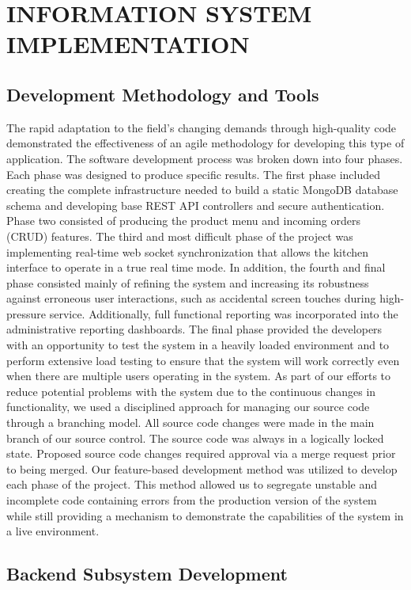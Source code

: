 \chapter{INFORMATION SYSTEM IMPLEMENTATION}

\section{Development Methodology and Tools}

The rapid adaptation to the field's changing demands through high-quality code demonstrated the effectiveness of an agile methodology for developing this type of application. The software development process was broken down into four phases. Each phase was designed to produce specific results. The first phase included creating the complete infrastructure needed to build a static MongoDB database schema and developing base REST API controllers and secure authentication. Phase two consisted of producing the product menu and incoming orders (CRUD) features. The third and most difficult phase of the project was implementing real-time web socket synchronization that allows the kitchen interface to operate in a true real time mode. In addition, the fourth and final phase consisted mainly of refining the system and increasing its robustness against erroneous user interactions, such as accidental screen touches during high-pressure service. Additionally, full functional reporting was incorporated into the administrative reporting dashboards. The final phase provided the developers with an opportunity to test the system in a heavily loaded environment and to perform extensive load testing to ensure that the system will work correctly even when there are multiple users operating in the system. As part of our efforts to reduce potential problems with the system due to the continuous changes in functionality, we used a disciplined approach for managing our source code through a branching model. All source code changes were made in the main branch of our source control. The source code was always in a logically locked state. Proposed source code changes required approval via a merge request prior to being merged. Our feature-based development method was utilized to develop each phase of the project. This method allowed us to segregate unstable and incomplete code containing errors from the production version of the system while still providing a mechanism to demonstrate the capabilities of the system in a live environment.

\section{Backend Subsystem Development}

